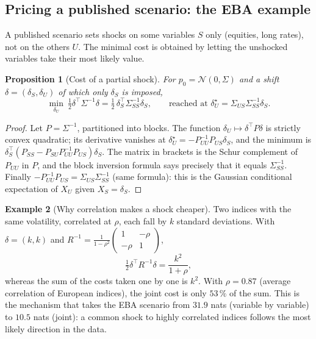 \documentclass[11pt]{article}
\theoremstyle{plain}
\newtheorem{proposition}{Proposition}[section]
\theoremstyle{definition}
\newtheorem{exemple}[proposition]{Example}
\theoremstyle{remark}
\newcommand{\N}{\mathcal{N}}
\begin{document}
\subsection{Pricing a published scenario: the EBA example}

A published scenario sets shocks on some variables $S$ only (equities, long
rates), not on the others $U$. The minimal cost is obtained by letting the
unshocked variables take their most likely value.

\begin{proposition}[Cost of a partial shock]
\label{prop:partiel}
For $p_0=\N(0,\Sigma)$ and a shift $\delta=(\delta_S,\delta_U)$ of which only
$\delta_S$ is imposed,
\[
\min_{\delta_U}\ \tfrac12\delta^\top\Sigma^{-1}\delta
=\tfrac12\,\delta_S^\top\Sigma_{SS}^{-1}\delta_S ,
\qquad\text{reached at }\delta_U^\star=\Sigma_{US}\Sigma_{SS}^{-1}\delta_S .
\]
\end{proposition}

\begin{proof}
Let $P=\Sigma^{-1}$, partitioned into blocks. The function
$\delta_U\mapsto\delta^\top P\delta$ is strictly convex quadratic; its
derivative vanishes at $\delta_U^\star=-P_{UU}^{-1}P_{US}\delta_S$, and the
minimum is $\delta_S^\top(P_{SS}-P_{SU}P_{UU}^{-1}P_{US})\delta_S$. The matrix
in brackets is the Schur complement of $P_{UU}$ in $P$, and the block
inversion formula says precisely that it equals $\Sigma_{SS}^{-1}$. Finally
$-P_{UU}^{-1}P_{US}=\Sigma_{US}\Sigma_{SS}^{-1}$ (same formula): this is the
Gaussian conditional expectation of $X_U$ given $X_S=\delta_S$.
\end{proof}

\begin{exemple}[Why correlation makes a shock cheaper]
Two indices with the same volatility, correlated at $\rho$, each fall by $k$
standard deviations. With $\delta=(k,k)$ and $R^{-1}=\frac1{1-\rho^2}
\begin{pmatrix}1&-\rho\\-\rho&1\end{pmatrix}$,
\[
\tfrac12\delta^\top R^{-1}\delta=\frac{k^2}{1+\rho},
\]
whereas the sum of the costs taken one by one is $k^2$. With $\rho=0.87$
(average correlation of European indices), the joint cost is only $53\,\%$ of
the sum. This is the mechanism that takes the EBA scenario from $31.9$ nats
(variable by variable) to $10.5$ nats (joint): a common shock to highly
correlated indices follows the most likely direction in the data.
\end{exemple}
\end{document}
